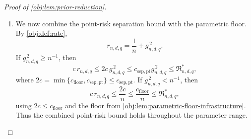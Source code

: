 \documentclass[11pt]{article}
\begin{document}
\begin{proof}[Proof of \cref{obj:lem:prior-reduction}]
\begin{enumerate}
\[=2a_{\mathrm{len}}.
\]
Since interval length is nonnegative everywhere,
\[
2a_{\mathrm{len}}\,
\mathbf1_{E_{\mathrm L,\alpha}\cap E_{\mathrm R,\alpha}}(o)
\le U_I(o)-L_I(o).
\]
Integration under the plus mixture, followed by its defining mixture
identity, therefore gives
\[
\begin{aligned}
2a_{\mathrm{len}}\,
Q_{+,\mathrm{len}}^{(n)}
 (E_{\mathrm L,\alpha}\cap E_{\mathrm R,\alpha})
&\le
\int_{O^n}(U_I(o)-L_I(o))\,Q_{+,\mathrm{len}}^{(n)}(do)\\
&=
\int_{\mathcal M(d,q)}
\mathbb E_P[U_I(O^n)-L_I(O^n)]\,\Pi_{+,\mathrm{len}}(dP)\\
&\le
\sup_{P\in\mathcal M(d,q)}
\mathbb E_P[U_I(O^n)-L_I(O^n)].
\end{aligned}
\]
Multiplication of the intersection bound by \(2a_{\mathrm{len}}\ge0\)
and substitution of \(\beta_\alpha\) yield
\[
\begin{aligned}
\sup_{P\in\mathcal M(d,q)}
\mathbb E_P[U_I(O^n)-L_I(O^n)]
&\ge2a_{\mathrm{len}}(1-2\alpha-3\beta_\alpha)\\
&=2a_{\mathrm{len}}\frac58(1-2\alpha)\\
&=\frac54c_{\beta_\alpha}(1-2\alpha)g_{n,d,q}.
\end{aligned}
\]
Lengths lie in \([0,2]\), justifying these integrations, and the constant
interval \([-1,1]\) is honest because \(\tau(P)\in[-1,1]\).
Taking the infimum in \cref{obj:def:length-risk} proves
\[
\mathfrak L^*_{n,d,q,\alpha}
\ge c_{\mathrm{sep,len},\alpha}g_{n,d,q}
=\frac54c_{\beta_\alpha}(1-2\alpha)g_{n,d,q}.
\]

\item We now combine the point-risk separation bound with the parametric
floor. By \cref{obj:def:rate},
\[
r_{n,d,q}=\frac1n+g_{n,d,q}^{\,2}.
\]
If \(g_{n,d,q}^{\,2}\ge n^{-1}\), then
\[
c\,r_{n,d,q}
\le 2c\,g_{n,d,q}^{\,2}
\le c_{\mathrm{sep,pt}}g_{n,d,q}^{\,2}
\le\mathfrak R^*_{n,d,q},
\]
where \(2c=\min\{c_{\mathrm{floor}},c_{\mathrm{sep,pt}}\}\le c_{\mathrm{sep,pt}}\).
If \(g_{n,d,q}^{\,2}<n^{-1}\), then
\[
c\,r_{n,d,q}
\le \frac{2c}{n}
\le \frac{c_{\mathrm{floor}}}{n}
\le\mathfrak R^*_{n,d,q},
\]
using \(2c\le c_{\mathrm{floor}}\) and the floor from
\cref{obj:lem:parametric-floor-infrastructure}.
Thus the combined point-risk bound holds throughout the parameter range.


\end{enumerate}
\end{proof}
\end{document}
